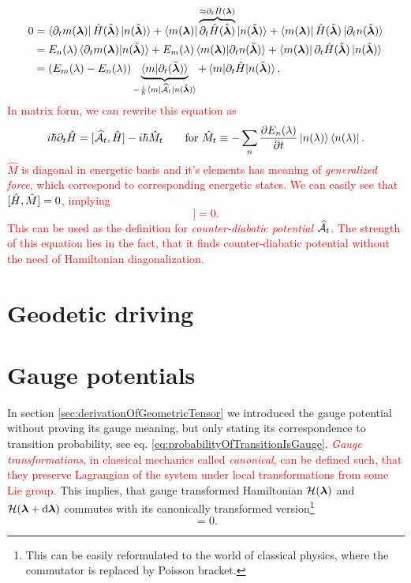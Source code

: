\begin{equation}
    \begin{split}
        0&=\bra{\partial_t m(\llambda)}\HH(\tilde \llambda)\ket{n(\tilde\llambda)}+ \bra{m(\llambda)}\overbrace{\partial_t\HH(\tilde \llambda)}^{\approx \partial_t\HH(\llambda)}\ket{n(\tilde\llambda)}+ \bra{m(\llambda)}\HH(\tilde \llambda)\ket{\partial_t n(\tilde \llambda)}\\
        &=E_n(\lambda)\braket{\partial_t m(\llambda)|n(\tilde \llambda)} + E_m(\lambda)\braket{m(\llambda)|\partial_t n(\tilde \llambda)}+ \bra{m(\llambda)}\partial_t \HH(\tilde\llambda)\ket{n(\tilde \llambda)}\\
        &= (E_m(\lambda)-E_n(\lambda))\underbrace{\braket{m|\partial_t (\tilde \llambda)}}_{-\frac{i}{\hbar}\bra{m}\AA_t\ket{n(\tilde \llambda)}} + \braket{m|\partial_t\HH|n(\tilde \llambda)}.
    \end{split}
\end{equation}
\textcolor{red}{
In matrix form, we can rewrite this equation as
\begin{equation}
    i\hbar\partial_t\HH=[\AA_t,\HH]-i\hbar \hat{M}_t\qquad \text{for } \hat{M}_t\equiv -\sum_n\pder{E_n(\lambda)}{t}\ket{n(\lambda)}\bra{n(\lambda)}.
\end{equation}
$\hat{M}$ is diagonal in energetic basis and it's elements has meaning of \emph{generalized force}, which correspond to corresponding energetic states. We can easily see that $[\HH,\hat{M}]=0$, implying
\begin{equation}
    [\HH,i\hbar\partial_t\HH-[\AA_t,\HH]]=0.
    \label{eq:komutation}
\end{equation}
This can be used as the definition for \emph{counter-diabatic potential} $\AA_t$. The strength of this equation lies in the fact, that it finds counter-diabatic potential without the need of Hamiltonian diagonalization.}


\section{Geodetic driving}
\label{chap:gauge}

\section{Gauge potentials}
In section \ref{sec:derivationOfGeometricTensor} we introduced the gauge potential without proving its gauge meaning, but only stating its correspondence to transition probability, see eq. \ref{eq:probabilityOfTransitionIsGauge}.
\textcolor{red}{
\emph{Gauge transformations}, in classical mechanics called \emph{canonical}, can be defined such, that they preserve Lagrangian of the system under local transformations from some Lie group.} This implies, that gauge transformed Hamiltonian $\H(\llambda)$ and $\H(\llambda+\d \llambda)$ commutes with its canonically transformed version\footnote{This can be easily reformulated to the world of classical physics, where the commutator is replaced by Poisson bracket.} 
 \begin{equation}
     [\HH(\llambda),\HH(\llambda+\delta \llambda)]=0.
 \end{equation}

